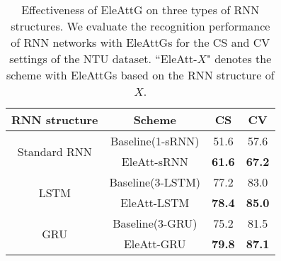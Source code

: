 \documentclass[journal]{IEEEtran}
\newcommand{\EleAttGn}{{EleAttG}}
\begin{document}
\setlength{\tabcolsep}{7pt}
\begin{table}[t]
	\centering
	\caption{Effectiveness of {\EleAttGn} on three types of RNN structures. We evaluate the recognition performance of RNN networks with {\EleAttGn}s for the CS and CV settings of the NTU dataset. ``EleAtt-$X$" denotes the scheme with {\EleAttGn}s based on the RNN structure of $X$.}
	\label{tab:Extend}
	\begin{tabular}{cccc}
		\toprule
		RNN structure                    & Scheme     & CS & CV \\
		\midrule
		\multirow{2}{*}{Standard RNN} & Baseline(1-sRNN)   & 51.6    & 57.6 \\
		& EleAtt-sRNN & \textbf{61.6}     & \textbf{67.2}  \\
		\midrule
		\multirow{2}{*}{LSTM}      & Baseline(3-LSTM)   & 77.2     & 83.0  \\
		& EleAtt-LSTM     & \textbf{78.4}     & \textbf{85.0}  \\
		\midrule
		\multirow{2}{*}{GRU}       & Baseline(3-GRU)   & 75.2     & 81.5  \\
		& EleAtt-GRU       & \textbf{79.8}     & \textbf{87.1} 							\\
		\bottomrule	
	\end{tabular}
\end{table}
\end{document}
